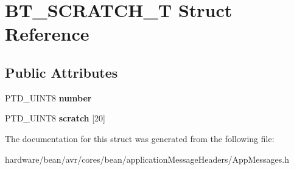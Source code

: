 \hypertarget{struct_b_t___s_c_r_a_t_c_h___t}{}\section{B\+T\+\_\+\+S\+C\+R\+A\+T\+C\+H\+\_\+T Struct Reference}
\label{struct_b_t___s_c_r_a_t_c_h___t}
\subsection*{Public Attributes}
\begin{DoxyCompactItemize}
\item 
P\+T\+D\+\_\+\+U\+I\+N\+T8 {\bfseries number}\hypertarget{struct_b_t___s_c_r_a_t_c_h___t_afa931e12cf31f7ba824213e012492c36}{}\label{struct_b_t___s_c_r_a_t_c_h___t_afa931e12cf31f7ba824213e012492c36}

\item 
P\+T\+D\+\_\+\+U\+I\+N\+T8 {\bfseries scratch} \mbox{[}20\mbox{]}\hypertarget{struct_b_t___s_c_r_a_t_c_h___t_a7a33ff73c781026808bc6bd7d27fa45d}{}\label{struct_b_t___s_c_r_a_t_c_h___t_a7a33ff73c781026808bc6bd7d27fa45d}

\end{DoxyCompactItemize}


The documentation for this struct was generated from the following file\+:\begin{DoxyCompactItemize}
\item 
hardware/bean/avr/cores/bean/application\+Message\+Headers/App\+Messages.\+h\end{DoxyCompactItemize}
